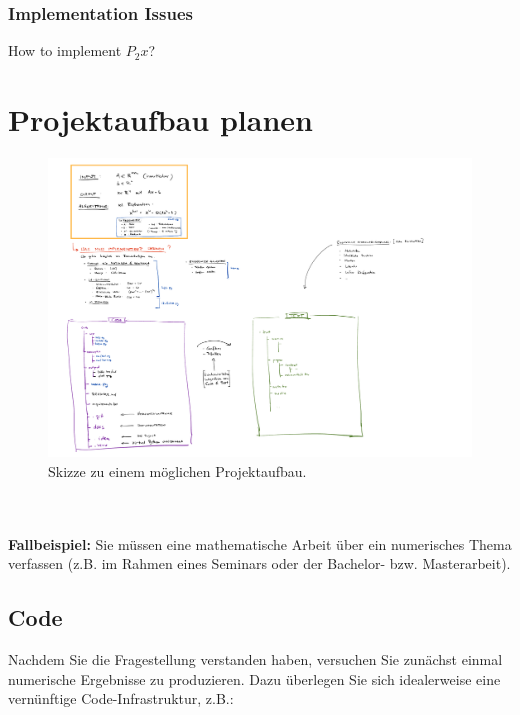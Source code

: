 \subsubsection{Implementation Issues}
How to implement $P_2 x$?


\clearpage
\section{Projektaufbau planen}
\begin{figure}[h!]
	\centering
	\includegraphics[width=1.3
	\linewidth]{./media//ProjectMindMap2}
	\caption[Mindmap zum Projektaufbau]{Skizze zu einem möglichen Projektaufbau.}
	\label{fig:projektaufbau}
\end{figure}
~\\~\\
\textbf{Fallbeispiel:} Sie müssen eine mathematische Arbeit über ein numerisches Thema verfassen (z.B. im Rahmen eines Seminars oder der Bachelor- bzw. Masterarbeit).

\subsection{Code} 
Nachdem Sie die Fragestellung verstanden haben, versuchen Sie zunächst einmal numerische Ergebnisse zu produzieren. Dazu überlegen Sie sich idealerweise eine vernünftige Code-Infrastruktur, z.B.: 

